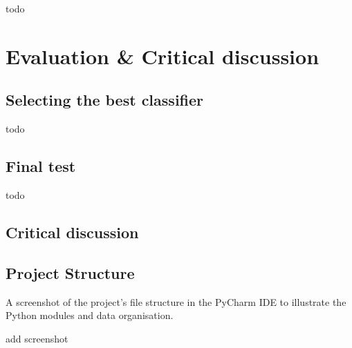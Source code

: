 \documentclass[letterpaper,12pt]{article}
\begin{document}
todo


\section{Evaluation \& Critical discussion}
\label{sec:evaluation}

\subsection{Selecting the best classifier}

todo

\subsection{Final test}

todo

\subsection{Critical discussion}



\begin{appendices}

\clearpage





\clearpage
\section{Project Structure}
\label{sec:appendix-project-structure}

A screenshot of the project's file structure in the PyCharm IDE to illustrate the Python modules and data organisation.

add screenshot


\end{appendices}
\end{document}
